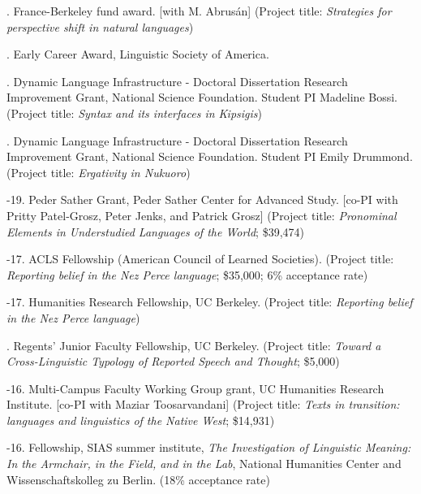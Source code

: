 \documentclass[12pt]{article}
\begin{document}
\bigskip






\setlength{\parskip}{2pt}
 
 
 . France-Berkeley fund award. [with M. Abrus\'an] (Project title: \emph{Strategies for perspective shift in natural languages}) 
 
. Early Career Award, Linguistic Society of America.

.
Dynamic Language Infrastructure - Doctoral Dissertation Research Improvement Grant, National Science Foundation. Student PI Madeline Bossi. (Project title:   \emph{Syntax and its interfaces in Kipsigis})
 
.
Dynamic Language Infrastructure - Doctoral Dissertation Research Improvement Grant, National Science Foundation. Student PI Emily Drummond. (Project title:   \emph{Ergativity in Nukuoro}) 

-19. Peder Sather Grant, Peder Sather Center for Advanced Study. [co-PI with Pritty Patel-Grosz, Peter Jenks, and Patrick Grosz] 
(Project title: \emph{Pronominal Elements in Understudied Languages of the World}; \$39,474)

-17. ACLS Fellowship (American Council of Learned Societies).  (Project title: \emph{Reporting belief in the Nez Perce language}; \$35,000; 6\% acceptance rate)

-17. Humanities Research Fellowship, UC Berkeley. (Project title: \emph{Reporting belief in the Nez Perce language})
 
 
 
. Regents' Junior Faculty Fellowship, UC Berkeley. (Project title: \emph{Toward a Cross-Linguistic Typology of Reported Speech and Thought}; \$5,000)

-16. Multi-Campus Faculty Working Group grant, UC Humanities Research Institute. [co-PI with Maziar Toosarvandani] (Project title: \emph{Texts in transition: languages and linguistics of the Native West}; \$14,931)

-16. Fellowship, SIAS summer institute, \emph{The Investigation of Linguistic Meaning: In the Armchair, in the Field, and in the Lab}, National Humanities Center  and Wissenschaftskolleg zu Berlin. (18\% acceptance rate)
\end{document}
